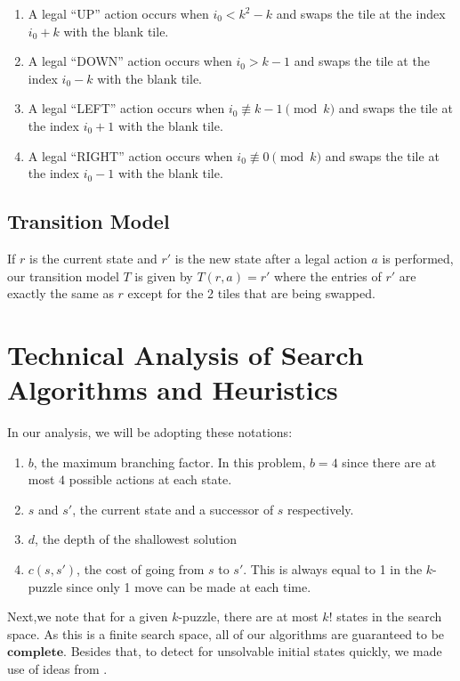 \documentclass[runningheads]{llncs}
\begin{document}
\begin{enumerate}
    \item A legal ``UP'' action occurs when $i_0 < k^{2} - k$ and swaps the tile at the index $i_0 + k$ with the blank tile.
    
    \item A legal ``DOWN'' action occurs when $i_0 > k - 1$ and swaps the tile at the index $i_0 - k$ with the blank tile.
    
    \item A legal ``LEFT'' action occurs when $i_0 \not\equiv k - 1 \pmod{k}$ and swaps the tile at the index $i_0 + 1$ with the blank tile.
    
    \item A legal ``RIGHT'' action occurs when $i_0 \not\equiv 0 \pmod{k}$ and swaps the tile at the index $i_0 - 1$ with the blank tile.
\end{enumerate}

\subsection{Transition Model}
If $r$ is the current state and $r'$ is the new state after a legal action $a$ is performed, our transition model $T$ is given by $ T(r, a) = r' $
where the entries of $r'$ are exactly the same as $r$ except for the 2 tiles that are being swapped. 

\section{Technical Analysis of Search Algorithms and Heuristics}
In our analysis, we will be adopting these notations: 
\begin{enumerate}
    \item $b$, the maximum branching factor. In this problem, $b = 4$ since there are at most $4$ possible actions at each state.
    \item $s$ and $s'$, the current state and a successor of $s$ respectively.
    \item $d$, the depth of the shallowest solution
    \item $c(s, s')$, the cost of going from $s$ to $s'$. This is always equal to 1 in the $k$-puzzle since only 1 move can be made at each time.
\end{enumerate}

Next,we note that for a given $k$-puzzle, there are at most $k!$ states in the search space. As this is a finite search space, all of our algorithms are guaranteed to be $\mathbf{complete}$. Besides that, to detect for unsolvable initial states quickly, we made use of ideas from \cite{ref_1}. 
\end{document}
